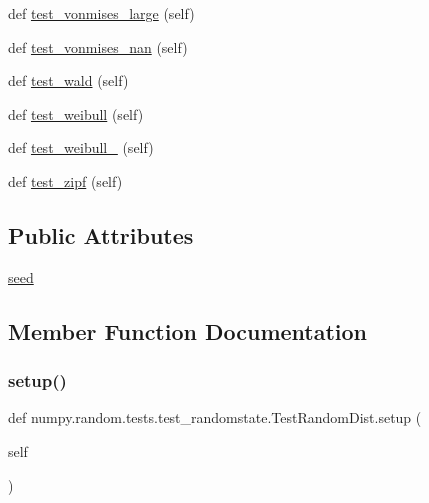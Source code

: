 \begin{DoxyCompactItemize}
\item 
def \hyperlink{classnumpy_1_1random_1_1tests_1_1test__randomstate_1_1TestRandomDist_af0378f013e9f77281ab2fb695df0384e}{test\+\_\+vonmises\+\_\+large} (self)
\item 
def \hyperlink{classnumpy_1_1random_1_1tests_1_1test__randomstate_1_1TestRandomDist_ab8f929f202fc79b5dd6356ecad80b4d8}{test\+\_\+vonmises\+\_\+nan} (self)
\item 
def \hyperlink{classnumpy_1_1random_1_1tests_1_1test__randomstate_1_1TestRandomDist_a895b52e73f1bc7b0cb45862a9581dedc}{test\+\_\+wald} (self)
\item 
def \hyperlink{classnumpy_1_1random_1_1tests_1_1test__randomstate_1_1TestRandomDist_acaff66b8388dccb83d31c6116afd57e5}{test\+\_\+weibull} (self)
\item 
def \hyperlink{classnumpy_1_1random_1_1tests_1_1test__randomstate_1_1TestRandomDist_a75d1b29a164edc89c20a8ed781c2b8f0}{test\+\_\+weibull\+\_} (self)
\item 
def \hyperlink{classnumpy_1_1random_1_1tests_1_1test__randomstate_1_1TestRandomDist_a9eddc3d0a1b6a7371cfdce53b7d8dbeb}{test\+\_\+zipf} (self)
\end{DoxyCompactItemize}
\subsection*{Public Attributes}
\begin{DoxyCompactItemize}
\item 
\hyperlink{classnumpy_1_1random_1_1tests_1_1test__randomstate_1_1TestRandomDist_a38e9978ab984af86b9dee8c61eeb5e42}{seed}
\end{DoxyCompactItemize}


\subsection{Member Function Documentation}
\mbox{\label{classnumpy_1_1random_1_1tests_1_1test__randomstate_1_1TestRandomDist_a42ff91b0d45ba372427f6d1243d30f72}} 
\subsubsection{\texorpdfstring{setup()}{setup()}}
{\footnotesize\ttfamily def numpy.\+random.\+tests.\+test\+\_\+randomstate.\+Test\+Random\+Dist.\+setup (\begin{DoxyParamCaption}\item[{}]{self }\end{DoxyParamCaption})}

